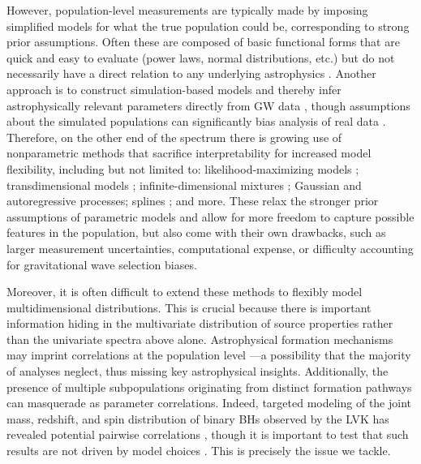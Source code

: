 \begin{refsection}
However, population-level measurements are typically made by imposing simplified models for what the true population could be, corresponding to strong prior assumptions. Often these are composed of basic functional forms that are quick and easy to evaluate (power laws, normal distributions, etc.) but do not necessarily have a direct relation to any underlying astrophysics \cite{KAGRA:2021duu}. Another approach is to construct simulation-based models and thereby infer astrophysically relevant parameters directly from GW data \cite{Zevin:2020gbd, Taylor:2018iat, Wong:2020ise, Mould:2022ccw, Riley:2023jep}, though assumptions about the simulated populations can significantly bias analysis of real data \cite{Cheng:2023ddt}. Therefore, on the other end of the spectrum there is growing use of nonparametric methods that sacrifice interpretability for increased model flexibility, including but not limited to: likelihood-maximizing models \cite{Payne:2022xan}; transdimensional models \cite{Toubiana:2023egi}; infinite-dimensional mixtures \cite{Rinaldi:2021bhm}; Gaussian \cite{Mandel:2016prl, KAGRA:2021duu, Ray:2023upk, Farah:2024xub} and autoregressive \cite{Callister:2023tgi} processes; splines \cite{Edelman:2022ydv, Golomb:2022bon}; and more. These relax the stronger prior assumptions of parametric models and allow for more freedom to capture possible features in the population, but also come with their own drawbacks, such as larger measurement uncertainties, computational expense, or difficulty accounting for gravitational wave selection biases.

Moreover, it is often difficult to extend these methods to flexibly model multidimensional distributions. This is crucial because there is important information hiding in the multivariate distribution of source properties rather than the univariate spectra above alone. Astrophysical formation mechanisms may imprint correlations at the population level \cite{PortegiesZwart:2002iks, Rodriguez:2015oxa, Bavera:2020uch, Bavera:2022mef, Santini:2023ukl, Baibhav:2022qxm, Gerosa:2021mno, vanSon:2021zpk, Marchant:2023ncp}---a possibility that the majority of analyses neglect, thus missing key astrophysical insights. Additionally, the presence of multiple subpopulations originating from distinct formation pathways can masquerade as parameter correlations. Indeed, targeted modeling of the joint mass, redshift, and spin distribution of binary BHs observed by the LVK has revealed potential pairwise correlations \cite{Callister:2021fpo, Biscoveanu:2022qac, Franciolini:2022iaa, Li:2023yyt, Pierra:2024fbl, Ray:2024hos, Rinaldi:2023bbd}, though it is important to test that such results are not driven by model choices \cite{Heinzel:2023hlb}. This is precisely the issue we tackle.


\end{refsection}
